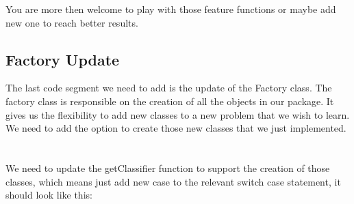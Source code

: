 \documentclass[11pt, oneside]{article}   	%
\begin{document}
You are more then welcome to play with those feature functions or maybe add new one to reach better results.

\subsection{Factory Update}
The last code segment we need to add is the update of the Factory class. The factory class is responsible on the creation of all the objects in our package. It gives us the flexibility to add new classes to a new problem that we wish to learn.
We need to add the option to create those new classes that we just implemented. \\ \\ \\
We need to update the getClassifier function to support the creation of those classes, which means just add new case to the relevant switch case statement,  it should look like this: 
\end{document}
